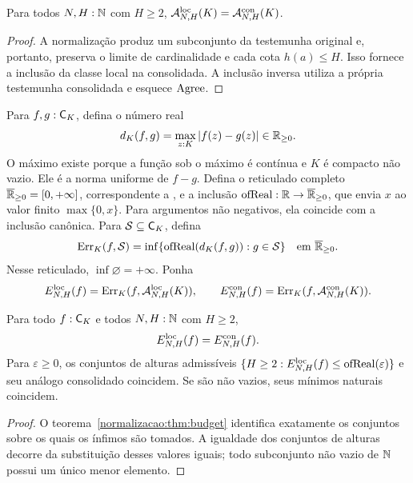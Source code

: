 \begin{teorema}\label{map:normalizacao:6.2}\label{normalizacao:thm:budget}
Para todos $N,H:\mathbb N$ com $H\ge2$,
$\mathcal A^{\mathrm{loc}}_{N,H}(K)=\mathcal A^{\mathrm{con}}_{N,H}(K)$.
\end{teorema}
\begin{proof}
A normalização produz um subconjunto da testemunha original e, portanto,
preserva o limite de cardinalidade e cada cota $h(a)\le H$.
Isso fornece a inclusão da classe local na consolidada. A inclusão inversa utiliza
a própria testemunha consolidada e esquece $\operatorname{Agree}$.
\end{proof}

\begin{definicao}\label{map:normalizacao:6.3}
Para $f,g:\mathsf C_K$, defina o número real
\[
 d_K(f,g)=\max_{z:K}|f(z)-g(z)|\in\mathbb R_{\ge0}.
\]
O máximo existe porque a função sob o máximo é contínua e $K$ é
compacto não vazio. Ele é a norma uniforme de $f-g$.
Defina o reticulado completo
$\overline{\mathbb R}_{\ge0}=[0,+\infty]$, correspondente a , e a inclusão
$\operatorname{ofReal}:\mathbb R\to\overline{\mathbb R}_{\ge0}$, que envia $x$ ao
valor finito $\max\{0,x\}$. Para argumentos não negativos, ela
coincide com a inclusão canônica.
Para $\mathcal S\subseteq\mathsf C_K$, defina
\[
 \operatorname{Err}_K(f,\mathcal S)=
 \inf\{\operatorname{ofReal}(d_K(f,g)):g\in\mathcal S\}
 \quad\text{em }\overline{\mathbb R}_{\ge0}.
\]
Nesse reticulado, $\inf\varnothing=+\infty$. Ponha
\[
 E^{\rm loc}_{N,H}(f)=\operatorname{Err}_K(f,\mathcal A^{\mathrm{loc}}_{N,H}(K)),\qquad
 E^{\rm con}_{N,H}(f)=\operatorname{Err}_K(f,\mathcal A^{\mathrm{con}}_{N,H}(K)).
\]
\end{definicao}

\begin{corolario}\label{map:normalizacao:6.4}
Para todo $f:\mathsf C_K$ e todos $N,H:\mathbb N$ com $H\ge2$,
\[
 E^{\rm loc}_{N,H}(f)=E^{\rm con}_{N,H}(f).
\]
Para $\varepsilon\ge0$, os conjuntos de alturas admissíveis
$\{H\ge2:E^{\rm loc}_{N,H}(f)\le\operatorname{ofReal}(\varepsilon)\}$
e seu análogo consolidado coincidem. Se são não vazios, seus mínimos
naturais coincidem.
\end{corolario}
\begin{proof}
O teorema~\ref{normalizacao:thm:budget} identifica exatamente os conjuntos sobre
os quais os ínfimos são tomados. A igualdade dos conjuntos de alturas
decorre da substituição desses valores iguais; todo subconjunto não vazio
de $\mathbb N$ possui um único menor elemento.
\end{proof}

